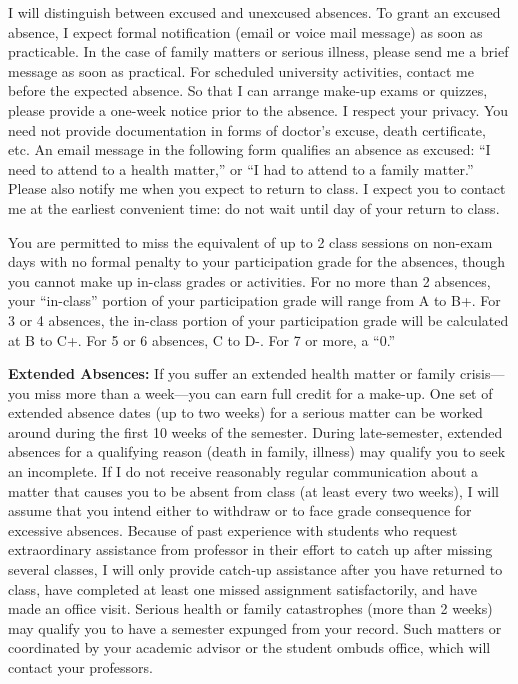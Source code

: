 \documentclass[]{article}
\begin{document}
I will distinguish between excused and unexcused absences. To grant an
excused absence, I expect formal notification (email or voice mail
message) as soon as practicable. In the case of family matters or
serious illness, please send me a brief message as soon as practical.
For scheduled university activities, contact me {before} the expected
absence. So that I can arrange make-up exams or quizzes, please provide
a one-week notice prior to the absence. I respect your privacy. You need
not provide documentation in forms of doctor's excuse, death
certificate, etc. An email message in the following form qualifies an
absence as excused: ``I need to attend to a health matter,'' or ``I had
to attend to a family matter.'' Please also notify me when you expect to
return to class. I expect you to contact me at the earliest convenient
time: do not wait until day of your return to class.

You are permitted to miss the equivalent of up to 2 class sessions on
non-exam days with no formal penalty to your participation grade for the
absences, though you cannot make up in-class grades or activities. For
no more than 2 absences, your ``in-class'' portion of your participation
grade will range from A to B+. For 3 or 4 absences, the in-class portion
of your participation grade will be calculated at B to C+. For 5 or 6
absences, C to D-. For 7 or more, a ``0.''

\textbf{Extended Absences:} If you suffer an extended health matter or
family crisis---you miss more than a week---you can earn full credit for
a make-up. One set of extended absence dates (up to two weeks) for a
serious matter can be worked around during the first 10 weeks of the
semester. During late-semester, extended absences for a qualifying
reason (death in family, illness) may qualify you to seek an incomplete.
If I do not receive reasonably regular communication about a matter that
causes you to be absent from class (at least every two weeks), I will
assume that you intend either to withdraw or to face grade consequence
for excessive absences. Because of past experience with students who
request extraordinary assistance from professor in their effort to catch
up after missing several classes, I will only provide catch-up
assistance after you have returned to class, have completed at least one
missed assignment satisfactorily, and have made an office visit. Serious
health or family catastrophes (more than 2 weeks) may qualify you to
have a semester expunged from your record. Such matters or coordinated
by your academic advisor or the student ombuds office, which will
contact your professors.
\end{document}
